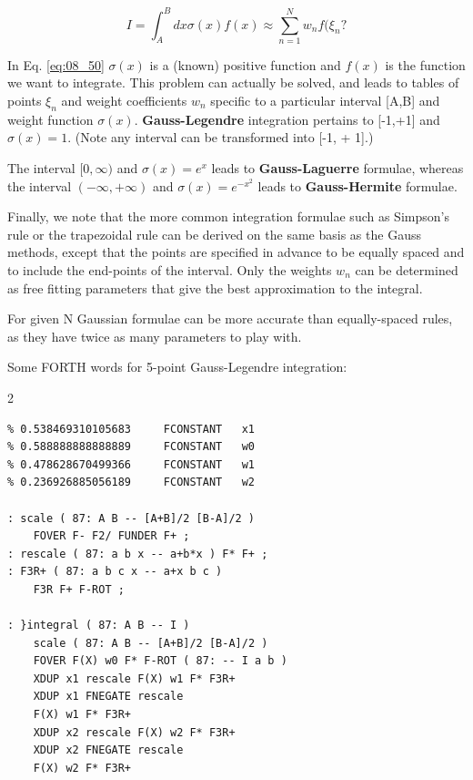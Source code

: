 \begin{equation}\label{eq:08_50}
I = \int_{A}^{B} dx \sigma(x)f(x) \approx \sum_{n=1}^{N} w_{n}f(\xi_{n} ?
\end{equation}

In Eq. \ref{eq:08_50} $\sigma(x)$ is a (known) positive function and $f(x)$ is the function we want to integrate. This problem can actually be solved, and leads to tables of points $\xi_n$ and weight coefficients $w_{n}$ specific to a particular interval [A,B] and weight function $\sigma(x)$. \textbf{Gauss-Legendre} integration pertains to [-1,+1] and $\sigma(x) = 1$. (Note any interval can be transformed into [-1, + 1].)

The interval $[0, \infty)$ and $\sigma(x) = e^{x}$ leads to \textbf{Gauss-Laguerre} formulae, whereas the interval $(-\infty, +\infty)$ and $\sigma(x) = e^{-x^{2}}$ leads to \textbf{Gauss-Hermite} formulae.

Finally, we note that the more common integration formulae such as Simpson’s rule or the trapezoidal rule can be derived on the same basis as the Gauss methods, except that the points are specified in advance to be equally spaced and to include the end-points of the interval. Only the weights $w_{n}$ can be determined as free fitting parameters that give the best approximation to the integral.

For given N Gaussian formulae can be more accurate than equally-spaced rules, as they have twice as many parameters to play with.

Some FORTH words for 5-point Gauss-Legendre integration:
\begin{multicols}{2}
    \begin{lstlisting}[basicstyle=\scriptsize,]
% 0.906179845938664     FCONSTANT   x2
% 0.538469310105683     FCONSTANT   x1
% 0.588888888888889     FCONSTANT   w0
% 0.478628670499366     FCONSTANT   w1
% 0.236926885056189     FCONSTANT   w2

: scale ( 87: A B -- [A+B]/2 [B-A]/2 )
    FOVER F- F2/ FUNDER F+ ;
: rescale ( 87: a b x -- a+b*x ) F* F+ ;
: F3R+ ( 87: a b c x -- a+x b c )
    F3R F+ F-ROT ;

: }integral ( 87: A B -- I )
    scale ( 87: A B -- [A+B]/2 [B-A]/2 )
    FOVER F(X) w0 F* F-ROT ( 87: -- I a b )
    XDUP x1 rescale F(X) w1 F* F3R+
    XDUP x1 FNEGATE rescale
    F(X) w1 F* F3R+
    XDUP x2 rescale F(X) w2 F* F3R+
    XDUP x2 FNEGATE rescale
    F(X) w2 F* F3R+
    \end{lstlisting}
\end{multicols}

